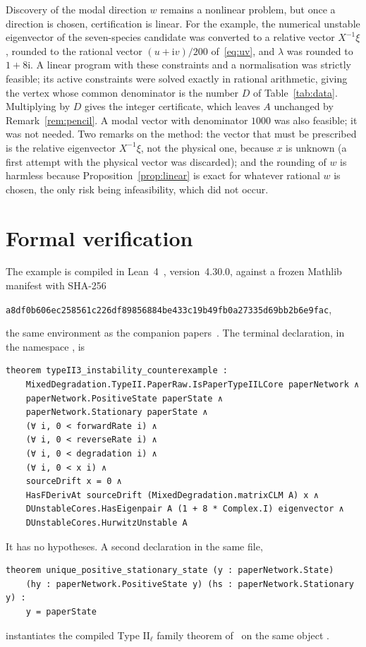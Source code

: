 \documentclass[11pt,a4paper]{article}
\theoremstyle{plain}
\theoremstyle{definition}
\theoremstyle{remark}
\numberwithin{equation}{section}
\newcommand{\II}{\mathrm{II}}
\newcommand{\iu}{\mathrm{i}}
\begin{document}
Discovery of the modal direction $w$ remains a nonlinear problem, but once a direction is chosen, certification is linear. For the example, the numerical unstable eigenvector of the seven-species candidate was converted to a relative vector $X^{-1}\xi$, rounded to the rational vector $(u+\iu v)/200$ of~\eqref{eq:uv}, and $\lambda$ was rounded to $1+8\iu$. A linear program with these constraints and a normalisation was strictly feasible; its active constraints were solved exactly in rational arithmetic, giving the vertex whose common denominator is the number $D$ of Table~\ref{tab:data}. Multiplying by $D$ gives the integer certificate, which leaves $A$ unchanged by Remark~\ref{rem:pencil}. A modal vector with denominator $1000$ was also feasible; it was not needed. Two remarks on the method: the vector that must be prescribed is the relative eigenvector $X^{-1}\xi$, not the physical one, because $x$ is unknown (a first attempt with the physical vector was discarded); and the rounding of $w$ is harmless because Proposition~\ref{prop:linear} is exact for whatever rational $w$ is chosen, the only risk being infeasibility, which did not occur.

\section{Formal verification}\label{sec:formal}

The example is compiled in Lean~4~\cite{dMU21}, version~4.30.0, against a frozen Mathlib~\cite{mathlib20} manifest with SHA-256
\begin{center}\small\texttt{a8df0b606ec258561c226df89856884be433c19b49fb0a27335d69bb2b6e9fac},\end{center}
the same environment as the companion papers~\cite{TypeIIpos,TypeIImixed}. The terminal declaration, in the namespace , is
\begin{lstlisting}
theorem typeII3_instability_counterexample :
    MixedDegradation.TypeII.PaperRaw.IsPaperTypeIILCore paperNetwork ∧
    paperNetwork.PositiveState paperState ∧
    paperNetwork.Stationary paperState ∧
    (∀ i, 0 < forwardRate i) ∧
    (∀ i, 0 < reverseRate i) ∧
    (∀ i, 0 < degradation i) ∧
    (∀ i, 0 < x i) ∧
    sourceDrift x = 0 ∧
    HasFDerivAt sourceDrift (MixedDegradation.matrixCLM A) x ∧
    DUnstableCores.HasEigenpair A (1 + 8 * Complex.I) eigenvector ∧
    DUnstableCores.HurwitzUnstable A
\end{lstlisting}
It has no hypotheses. A second declaration in the same file,
\begin{lstlisting}
theorem unique_positive_stationary_state (y : paperNetwork.State)
    (hy : paperNetwork.PositiveState y) (hs : paperNetwork.Stationary y) :
    y = paperState
\end{lstlisting}
instantiates the compiled Type $\II_\ell$ family theorem  of~\cite{TypeIImixed} on the same object .
\end{document}

